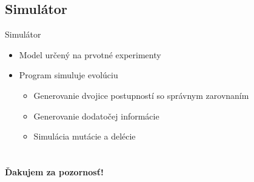\documentclass[xcolor=dvipsnames, compress, 12pt]{beamer}
\begin{document}
\subsection{Simulátor}
\begin{frame}{Simulátor}
  \begin{itemize}
    \item Model určený na prvotné experimenty
    \item Program simuluje evolúciu
    \begin{itemize}
      \item Generovanie dvojice postupností so správnym zarovnaním
      \item Generovanie dodatočej informácie
      \item Simulácia mutácie a delécie
    \end{itemize} 
  \end{itemize} 
\end{frame}


\section{}
\begin{frame}[plain]
  \transdissolve[duration=5]
  \begin{center}
  \textbf{\color{Green} \LARGE Ďakujem za pozornosť!} 
  \end{center}  
\end{frame}
\end{document}
